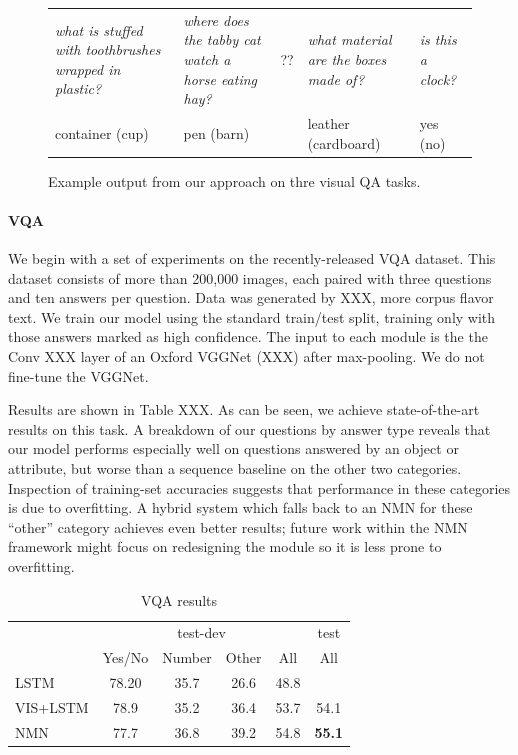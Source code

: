 \begin{figure}
\begin{tabular}{*{5}{m{}}}
    \emph{what is stuffed with toothbrushes wrapped in plastic?} & 
    \emph{where does the tabby cat watch a horse eating hay?} &
    ?? & 
    \emph{what material are the boxes made of?} &
    \emph{is this a clock?} \\
    container (cup) &
    pen (barn) &
    & 
    leather (cardboard) &
    yes (no) 
  \end{tabular}
  \caption{Example output from our approach on thre visual QA tasks.}
\end{figure}

\paragraph{VQA}
We begin with a set of experiments on the recently-released VQA dataset. This
dataset consists of more than 200,000 images, each paired with three questions
and ten answers per question. Data was generated by XXX, more corpus flavor
text. We train our model using the standard train/test split, training only with
those answers marked as high confidence.
The input to each  module is the the Conv XXX layer of an Oxford
VGGNet (XXX) after max-pooling. We do not fine-tune the VGGNet.

Results are shown in Table XXX. As can be seen, we achieve state-of-the-art
results on this task. A breakdown of our questions by answer type reveals that
our model performs especially well on questions answered by an object or
attribute, but worse than a sequence baseline on the other two categories.
Inspection of training-set accuracies suggests that performance in these
categories is due to overfitting. A hybrid system which falls back to an NMN
for these ``other'' category achieves even better results; future work within
the NMN framework might focus on redesigning the  module
so it is less prone to overfitting.

\begin{table}
  \footnotesize
  \center
  \begin{tabular}{lccccc}
    \toprule
    & \multicolumn{4}{c}{test-dev} & test \\
    \cmidrule(lr){2-5} \cmidrule(lr){6-6}
    & Yes/No & Number & Other & All & All \\
    \midrule
    LSTM & 78.20 & 35.7 & 26.6 & 48.8 \\
    VIS+LSTM & 78.9 & 35.2 & 36.4 & 53.7 & 54.1 \\
    NMN & 77.7 & 36.8 & 39.2 & 54.8 & \bf 55.1 \\
    \bottomrule
  \end{tabular}
  \caption{VQA results}
\end{table}

